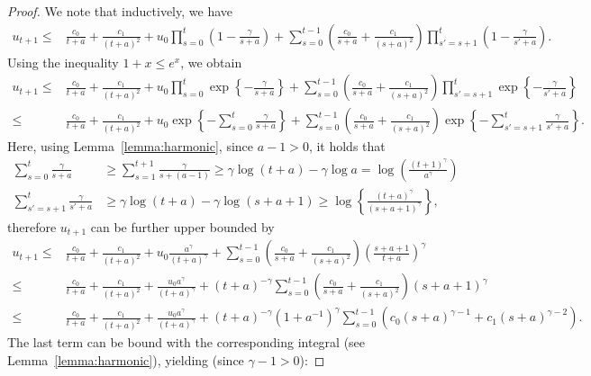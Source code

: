 \begin{proof}
We note that inductively, we have
\begin{align*}
u_{t+1} \leq &\frac{c_0}{t+a} + \frac{c_1}{(t+a)^2} + u_0 \prod_{s=0}^{t} \left( 1 - \frac{\gamma}{s+a} \right) 
     + \sum_{s=0}^{t-1} \left( \frac{c_0}{s+a} + \frac{c_1}{(s+a)^2} \right) \prod_{s'=s+1}^{t} \left(1 - \frac{\gamma}{s'+a} \right).
\end{align*}
Using the inequality $1 + x \leq e^{x}$, we obtain
\begin{align*}
u_{t+1} \leq &\frac{c_0}{t+a} + \frac{c_1}{(t+a)^2} + u_0 \prod_{s=0}^{t} \exp\left\{- \frac{\gamma}{s+a}\right\} + \sum_{s=0}^{t-1} \left( \frac{c_0}{s+a} + \frac{c_1}{(s+a)^2} \right) \prod_{s'=s+1}^{t} \exp\left\{ - \frac{\gamma}{s'+a}\right\} \\
\leq &\frac{c_0}{t+a} + \frac{c_1}{(t+a)^2} + u_0 \exp\left\{- \sum_{s=0}^{t}\frac{\gamma}{s+a}\right\} + \sum_{s=0}^{t-1} \left( \frac{c_0}{s+a} + \frac{c_1}{(s+a)^2} \right)  \exp\left\{ -\sum_{s'=s+1}^{t} \frac{\gamma}{s'+a}\right\}. 
\end{align*}
Here, using Lemma~\ref{lemma:harmonic}, since $a - 1 > 0$, it holds that
\begin{align*}
  \sum_{s=0}^{t}\frac{\gamma}{s+a} &\geq \sum_{s = 1}^{t+1} \frac{\gamma}{s+(a - 1)} \geq \gamma \log(t+a) - \gamma \log a = \log \left(\frac{(t+1)^\gamma}{a^\gamma}\right) \\
  \sum_{s'=s+1}^{t} \frac{\gamma}{s'+a} &\geq \gamma \log(t + a) - \gamma \log(s + a + 1) \geq \log \left\{ \frac{(t+a)^\gamma}{(s+a+1)^\gamma} \right\},
\end{align*}
therefore $u_{t+1}$ can be further upper bounded by
\begin{align*}
u_{t+1} \leq &\frac{c_0}{t+a} + \frac{c_1}{(t+a)^2} + u_0 \frac{a^\gamma}{ \left(t+a\right)^\gamma} + \sum_{s=0}^{t-1} \left( \frac{c_0}{s+a}  + \frac{c_1}{(s+a)^2} \right) \left(\frac{s + a + 1}{t+a}\right)^\gamma \\
\leq &\frac{c_0}{t+a} + \frac{c_1}{(t+a)^2} + \frac{u_0 a ^ \gamma}{\left(t+a\right)^\gamma} + (t+a)^{-\gamma} \sum_{s=0}^{t-1} \left( \frac{c_0}{s+a} + \frac{c_1}{(s+a)^2} \right) \left(s+a+1\right)^\gamma \\
\leq &\frac{c_0}{t+a} + \frac{c_1}{(t+a)^2} + \frac{u_0 a ^ \gamma}{\left(t+a\right)^\gamma} + (t+a)^{-\gamma} (1 + a^{-1})^\gamma \sum_{s=0}^{t-1} \left( c_0 \left(s+a\right)^{\gamma-1} + c_1\left(s+a\right)^{\gamma-2} \right) .
\end{align*}
The last term can be bound with the corresponding integral (see Lemma~\ref{lemma:harmonic}), yielding (since $\gamma-1 > 0$):

\end{proof}

